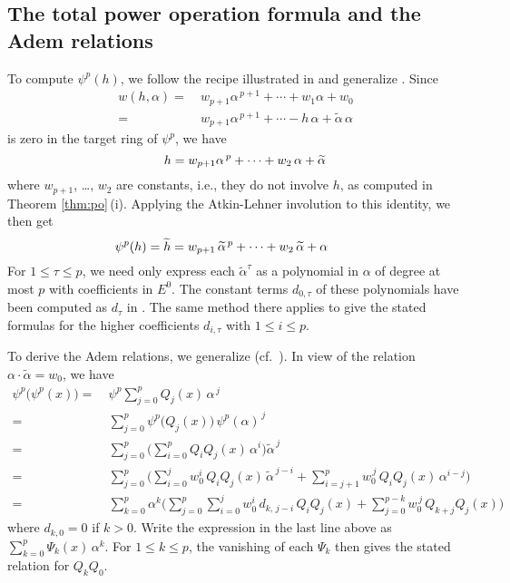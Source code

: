 \documentclass{gtpart}
\theoremstyle{definition}
\theoremstyle{remark}
\newcommand{\tA}{\widetilde{\A}}
\renewcommand{\th}{\widetilde{h}}
\newcommand{\A}{\alpha}
\newcommand{\T}{\tau}
\renewcommand{\=}{\approx}
\renewcommand{\-}{\sim}
\numberwithin{equation}{section}
\begin{document}
\subsection{The total power operation formula and the Adem relations}

To compute $\psi^p(h)$, we follow the recipe illustrated in 
\cite[Example 3.5]{ho} and generalize \cite[proof of Proposition 6.4]{ho}.  
Since 
\[
 \begin{split}
  w(h,\A) = & ~ w_{p + 1} \A^{\,p + 1} + \cdots + w_1 \A + w_0 \\
          = & ~ w_{p + 1} \A^{\,p + 1} + \cdots - h \, \A + \tA \, \A 
 \end{split}
\]
is zero in the target ring of $\psi^p$, we have 
\[
 \hskip .5cm h = w_{p + 1} \A^{\,p} + \cdots + w_2 \, \A + \tA 
\]
where $w_{p + 1}$, \ldots, $w_2$ are constants, i.e., they do not involve $h$, 
as computed in Theorem \ref{thm:po}\,(i).  Applying the Atkin-Lehner involution 
to this identity, we then get 
\[
 \hskip -.8cm \psi^p(h) = \th = w_{p + 1} \, \tA^{\,p} + \cdots + w_2 \, \tA 
 + \A 
\]
For $1 \leq \T \leq p$, we need only express each $\tA^\T$ as a polynomial in 
$\A$ of degree at most $p$ with coefficients in $E^0$.  The constant terms 
$d_{0,\T}$ of these polynomials have been computed as $d_\T$ in 
\cite[proof of Proposition 6.4]{ho}.  The same method there applies to give the 
stated formulas for the higher coefficients $d_{i,\T}$ with $1 \leq i \leq p$.  

To derive the Adem relations, we generalize 
\cite[proof of Proposition 3.6\,(iv)]{p3} 
(cf.~\cite[proof of Proposition 6.4]{ho}).  
In view of the relation $\A \cdot \tA = w_0$, we have 
\[
 \begin{split}
  \psi^p\big(\psi^p(x)\big) = & ~ \psi^p \sum_{j = 0}^p Q_j(x) \, \A^{\,j} \\
                            = & ~ \sum_{j = 0}^p \psi^p\big(Q_j(x)\big) \, 
                                  \psi^p(\A)^{\,j} \\
                            = & ~ \sum_{j = 0}^p \Bigg( \sum_{i = 0}^p 
                                  Q_i Q_j(x) \, \A^i \Bigg) \tA^{\,j} \\
                            = & ~ \sum_{j = 0}^p \Bigg( \sum_{i = 0}^j w_0^i \, 
                                  Q_i Q_j(x) \, \tA^{\,j - i} 
                                + \sum_{i = j + 1}^p w_0^{\,j} \, Q_i Q_j(x) \, 
                                \A^{i - j} \Bigg) \\
                            = & ~ \sum_{k = 0}^p \A^k \Bigg( \sum_{j = 0}^p 
                                  \sum_{i = 0}^j w_0^i \, d_{k,\,j - i} \, 
                                  Q_i Q_j(x) + \sum_{j = 0}^{p - k} w_0^{\,j} \, 
                                  Q_{k + j} Q_j (x) \Bigg) 
 \end{split}
\]
where $d_{k,0} = 0$ if $k > 0$.  Write the expression in the last line above as 
$\sum_{k = 0}^p \Psi_k(x) \, \A^k$.  For $1 \leq k \leq p$, the vanishing of 
each $\Psi_k$ then gives the stated relation for $Q_k Q_0$.  
\end{document}
